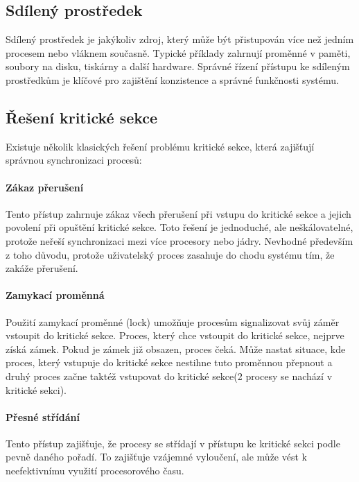 \subsection{Sdílený prostředek}
Sdílený prostředek je jakýkoliv zdroj, který může být přistupován více než jedním procesem nebo vláknem současně. Typické příklady zahrnují proměnné v paměti, soubory na disku, tiskárny a další hardware. Správné řízení přístupu ke sdíleným prostředkům je klíčové pro zajištění konzistence a správné funkčnosti systému.

\subsection{Řešení kritické sekce}

Existuje několik klasických řešení problému kritické sekce, která zajišťují správnou synchronizaci procesů:

\paragraph{Zákaz přerušení}
Tento přístup zahrnuje zákaz všech přerušení při vstupu do kritické sekce a jejich povolení při opuštění kritické sekce. Toto řešení je jednoduché, ale neškálovatelné, protože neřeší synchronizaci mezi více procesory nebo jádry. Nevhodné především z toho důvodu, protože uživatelský proces zasahuje do chodu systému tím, že zakáže přerušení.

\paragraph{Zamykací proměnná}
Použití zamykací proměnné (lock) umožňuje procesům signalizovat svůj záměr vstoupit do kritické sekce. Proces, který chce vstoupit do kritické sekce, nejprve získá zámek. Pokud je zámek již obsazen, proces čeká. Může nastat situace, kde proces, který vstupuje do kritické sekce nestihne tuto proměnnou přepnout a druhý proces začne taktéž vstupovat do kritické sekce(2 procesy se nachází v kritické sekci).

\paragraph{Přesné střídání}

Tento přístup zajišťuje, že procesy se střídají v přístupu ke kritické sekci podle pevně daného pořadí. To zajišťuje vzájemné vyloučení, ale může vést k neefektivnímu využití procesorového času.

